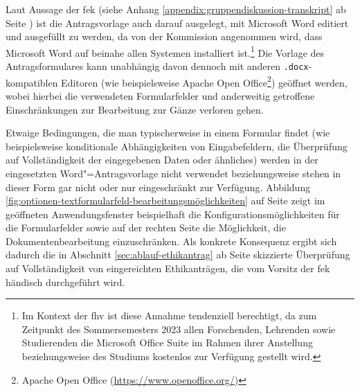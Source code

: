 \documentclass[a4paper,12pt,twoside]{scrreprt}
\begin{document}
Laut Aussage der \acl{fek} (siehe Anhang \ref{appendix:gruppendiskussion-transkript} ab Seite \pageref{appendix:gruppendiskussion-transkript}) ist die Antragsvorlage auch darauf ausgelegt, mit Microsoft Word editiert und ausgefüllt zu werden, da von der Kommission angenommen wird, dass Microsoft Word auf beinahe allen Systemen installiert ist.\footnote{Im Kontext der \acl{fhv} ist diese Annahme tendenziell berechtigt, da zum Zeitpunkt des Sommersemesters 2023 allen Forschenden, Lehrenden sowie Studierenden die Microsoft Office Suite im Rahmen ihrer Anstellung beziehungsweise des Studiums kostenlos zur Verfügung gestellt wird.} Die Vorlage des Antragsformulares kann unabhängig davon dennoch mit anderen \texttt{.docx}-kompatiblen Editoren (wie beispielsweise Apache Open Office\footnote{Apache Open Office (\url{https://www.openoffice.org/})}) geöffnet werden, wobei hierbei die verwendeten Formularfelder und anderweitig getroffene Einschränkungen zur Bearbeitung zur Gänze verloren gehen.

\medskip

Etwaige Bedingungen, die man typischerweise in einem Formular findet (wie beispielsweise konditionale Abhängigkeiten von Eingabefeldern, die Überprüfung auf Vollständigkeit der eingegebenen Daten oder ähnliches) werden in der eingesetzten Word"=Antragsvorlage nicht verwendet beziehungsweise stehen in dieser Form gar nicht oder nur eingeschränkt zur Verfügung. Abbildung \ref{fig:optionen-textformularfeld-bearbeitungsmöglichkeiten} auf Seite \pageref{fig:optionen-textformularfeld-bearbeitungsmöglichkeiten} zeigt im geöffneten Anwendungsfenster beispielhaft die Konfigurationsmöglichkeiten für die Formularfelder sowie auf der rechten Seite die Möglichkeit, die Dokumentenbearbeitung einzuschränken. Als konkrete Konsequenz ergibt sich dadurch die in Abschnitt \ref{sec:ablauf-ethikantrag} ab Seite \pageref{sec:ablauf-ethikantrag} skizzierte Überprüfung auf Vollständigkeit von eingereichten Ethikanträgen, die vom Vorsitz der \ac{fek} händisch durchgeführt wird.
\end{document}
